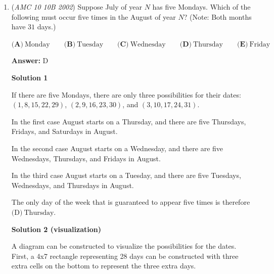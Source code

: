 \begin{enumerate}
 $42n|(41n+42)$.

 => $42|(41n + 42)$
\begin{verbatim}
but $42|42$, hence $42|41n$  but $42$ does not divides $41$,  $42|n$                                                                                                    -(1)
\end{verbatim}

=> $n|(41n+42)$
\begin{verbatim}
but $n|41n$,  $n|42$                                                                                                    -(2)
\end{verbatim}

from (1) and (2) we get that n=42.Comparing this with the options, we see that option E is the incorrect statement and hence E is the answer.

 


	\item (\textit{AMC 10 10B 2002}) Suppose July of year $N$ has five Mondays. Which of the following must occur five times in the August of year $N$? (Note: Both months have $31$ days.)


 $\textbf{(A)}\ \text{Monday} \qquad \textbf{(B)}\ \text{Tuesday} \qquad \textbf{(C)}\ \text{Wednesday} \qquad \textbf{(D)}\ \text{Thursday} \qquad \textbf{(E)}\ \text{Friday}$

 \textbf{Answer: }D



\textbf{Solution 1}

If there are five Mondays, there are only three possibilities for their dates: $(1,8,15,22,29)$, $(2,9,16,23,30)$, and $(3,10,17,24,31)$. 

 In the first case August starts on a Thursday, and there are five Thursdays, Fridays, and Saturdays in August. 

 In the second case August starts on a Wednesday, and there are five Wednesdays, Thursdays, and Fridays in August.

 In the third case August starts on a Tuesday, and there are five Tuesdays, Wednesdays, and Thursdays in August.

 The only day of the week that is guaranteed to appear five times is therefore $\boxed{\textrm{(D)}\ \text{Thursday}}$.

 



\textbf{Solution 2 (visualization)}

A diagram can be constructed to visualize the possibilities for the dates. First, a 4x7 rectangle representing 28 days can be constructed with three extra cells on the bottom to represent the three extra days. 


\end{enumerate}
